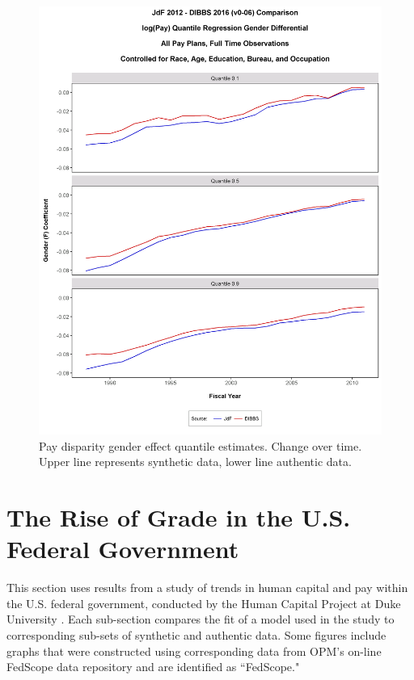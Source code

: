 \documentclass[10pt, letterpaper]{article}
\begin{document}
\begin{spacing}{1.0}
\begin{figure}[h]
    \centering
    \includegraphics[width=4.85in, trim={0 0.75in 0 1.5in}, clip]{GenderPayDifferentialQuantileRegressionAgeRaceEdPanelv0-06.png}
    \caption{Pay disparity gender effect quantile estimates.  Change over time.  Upper line represents synthetic data, lower line authentic data.}
    \label{figure:GenderPayDifferentialQuantileRegressionAgeRaceEdPanelv0-06}
\end{figure}

\clearpage

\section{The Rise of Grade in the U.S. Federal Government}

This section uses results from a study of trends in human capital and pay within the U.S. federal government, conducted by the Human Capital Project at Duke University \citep{BoltondeFigGradeInflation2016}.  Each sub-section compares the fit of a model used in the study to corresponding sub-sets of synthetic and authentic data.  Some figures include graphs that were constructed using corresponding data from OPM's on-line FedScope data repository  \citep{OPMFedScope} and are identified as ``FedScope."


\end{spacing}
\end{document}
